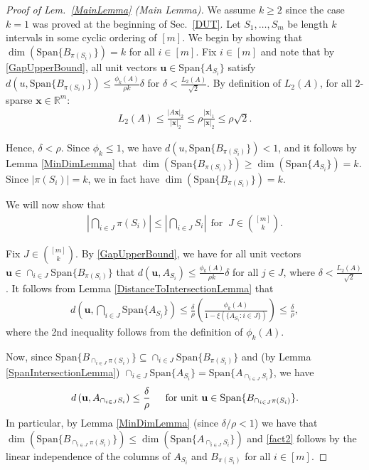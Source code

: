 \documentclass[journal, twocolumn]{IEEEtran}
\begin{document}
\begin{proof}[Proof of Lem.~\ref{MainLemma} (Main Lemma)]
We assume $k \geq 2$ since the case $k = 1$ was proved at the beginning of Sec.~\ref{DUT}. Let $S_1, \ldots, S_m$ be length $k$ intervals in some cyclic ordering of $[m]$. We begin by showing that $\dim(\text{Span}\{B_{\pi(S_i)}\}) = k$ for all $i \in [m]$. 
Fix $i \in [m]$ and note that by \eqref{GapUpperBound}, all unit vectors $\mathbf{u} \in \text{Span}\{A_{S_i}\}$ satisfy $d(u, \text{Span}\{B_{\pi(S_i)}\}) \leq \frac{\phi_k(A)}{\rho k} \delta$ for $\delta < \frac{L_2(A)}{ \sqrt{2}}$. By definition of $L_2(A)$, for all $2$-sparse $\mathbf{x} \in \mathbb{R}^m$:
\begin{align}
L_2(A) \leq \frac{|A\mathbf{x}|_2}{|\mathbf{x}|_2} \leq \rho \frac{|\mathbf{x}|_1}{|\mathbf{x}|_2} \leq \rho \sqrt{2}.
\end{align}

Hence, $\delta < \rho$. Since $\phi_k \leq 1$, we have $d(u, \text{Span}\{B_{\pi(S_i)}\}) < 1$, and it follows by Lemma \ref{MinDimLemma} that $\dim(\text{Span}\{B_{\pi(S_i)}\}) \geq \dim(\text{Span}\{A_{S_i}\}) = k$. Since $|\pi(S_i)| = k$, we in fact have $\dim(\text{Span}\{B_{\pi(S_i)}\}) = k$. %

We will now show that
\begin{align}\label{fact2}
|\bigcap_{i \in J} \pi(S_i)| \leq |\bigcap_{i \in J} S_i | \ \ \text{for } \ J \in {[m] \choose k}.
\end{align}

Fix $J \in {[m] \choose k}$. By \eqref{GapUpperBound}, we have for all unit vectors $\mathbf{u} \in \cap_{i \in J} \text{Span}\{B_{\pi(S_i)}\}$ that $d(\mathbf{u}, A_{S_i}) \leq \frac{\phi_k(A)}{\rho k} \delta$ for all $j \in J$, where $\delta < \frac{L_2(A)}{\sqrt{2}}$. It follows from Lemma \ref{DistanceToIntersectionLemma} that
\begin{align*}
d\left( \mathbf{u}, \bigcap_{i \in J} \text{Span}\{A_{S_j}\} \right) 
\leq \frac{\delta}{\rho} \left( \frac{ \phi_k(A) }{1 - \xi( \{ A_{S_i}: i \in J\} ) } \right) \leq \frac{\delta}{\rho},
\end{align*}
%
where the 2nd inequality follows from the definition of $\phi_k(A)$. 

Now, since \mbox{$\text{Span}\{B_{\cap_{i \in J}\pi(S_i)}\} \subseteq \cap_{i \in J} \text{Span}\{B_{\pi(S_i)}\}$} and (by Lemma \ref{SpanIntersectionLemma}) $\cap_{i \in J}  \text{Span}\{A_{S_i}\} = \text{Span}\{A_{\cap_{i \in J}  S_i}\}$, we have
\begin{align}\label{fact1}
d\left( \mathbf{u}, A_{\cap_{i \in J} S_i} \right) \leq \frac{\delta}{\rho} \indent \text{for unit } \mathbf{u} \in \text{Span}\{B_{\cap_{i \in J}\pi(S_i)}\}.
\end{align}
In particular, by Lemma \ref{MinDimLemma} (since $\delta/\rho < 1$) we have that $\dim(\text{Span}\{B_{\cap_{i \in J}\pi(S_i)}\}) \leq \dim(\text{Span}\{A_{\cap_{i \in J} S_i}\})$ and \eqref{fact2} follows by the linear independence of the columns of $A_{S_i}$ and $B_{\pi(S_i)}$ for all $i \in [m]$.


\end{proof}
\end{document}

